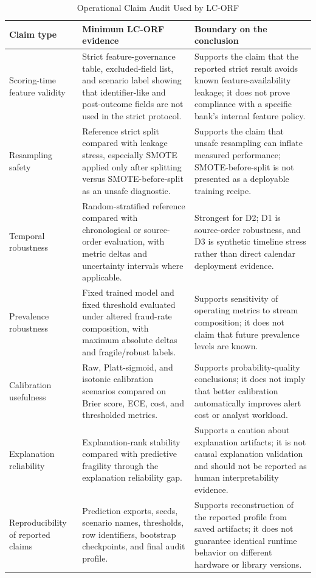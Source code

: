 \documentclass{ieeeaccess}
\begin{document}
\begin{table}[!t]
\caption{Operational Claim Audit Used by LC-ORF}
\label{tab:claim_audit}
\centering
\scriptsize
\setlength{\tabcolsep}{3pt}
\renewcommand{\arraystretch}{1.15}
\begin{tabularx}{\textwidth}{|>{\raggedright\arraybackslash}p{}|>{\raggedright\arraybackslash}p{}|>{\raggedright\arraybackslash}X|}
\hline
\textbf{Claim type} & \textbf{Minimum LC-ORF evidence} & \textbf{Boundary on the conclusion}\\
\hline
Scoring-time feature validity & Strict feature-governance table, excluded-field list, and scenario label showing that identifier-like and post-outcome fields are not used in the strict protocol. & Supports the claim that the reported strict result avoids known feature-availability leakage; it does not prove compliance with a specific bank's internal feature policy.\\
\hline
Resampling safety & Reference strict split compared with leakage stress, especially SMOTE applied only after splitting versus SMOTE-before-split as an unsafe diagnostic. & Supports the claim that unsafe resampling can inflate measured performance; SMOTE-before-split is not presented as a deployable training recipe.\\
\hline
Temporal robustness & Random-stratified reference compared with chronological or source-order evaluation, with metric deltas and uncertainty intervals where applicable. & Strongest for D2; D1 is source-order robustness, and D3 is synthetic timeline stress rather than direct calendar deployment evidence.\\
\hline
Prevalence robustness & Fixed trained model and fixed threshold evaluated under altered fraud-rate composition, with maximum absolute deltas and fragile/robust labels. & Supports sensitivity of operating metrics to stream composition; it does not claim that future prevalence levels are known.\\
\hline
Calibration usefulness & Raw, Platt-sigmoid, and isotonic calibration scenarios compared on Brier score, ECE, cost, and thresholded metrics. & Supports probability-quality conclusions; it does not imply that better calibration automatically improves alert cost or analyst workload.\\
\hline
Explanation reliability & Explanation-rank stability compared with predictive fragility through the explanation reliability gap. & Supports a caution about explanation artifacts; it is not causal explanation validation and should not be reported as human interpretability evidence.\\
\hline
Reproducibility of reported claims & Prediction exports, seeds, scenario names, thresholds, row identifiers, bootstrap checkpoints, and final audit profile. & Supports reconstruction of the reported profile from saved artifacts; it does not guarantee identical runtime behavior on different hardware or library versions.\\
\hline
\end{tabularx}
\end{table}
\end{document}
